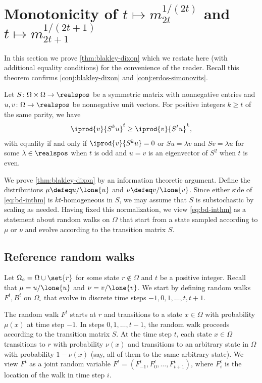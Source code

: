 \section{Monotonicity of 
$t\mapsto m_{2t}^{1/(2t)}$ and 
$t\mapsto m_{2t+1}^{1/(2t+1)}$}
\label{sec:heat:monotonicity}

In this section we prove \autoref{thm:blakley-dixon}
which we restate here 
(with additional equality conditions) 
for the convenience of the reader.
Recall this theorem confirms 
\autoref{conj:blakley-dixon} 
and \autoref{conj:erdos-simonovits}.

\begingroup
\def\thetheorem{\ref{thm:blakley-dixon}}
\begin{theorem}[restated]
Let $S\colon\Omega\times\Omega\to\realspos$ be a 
symmetric matrix with nonnegative entries and 
$u,v\colon\Omega\to\realspos$ be
nonnegative unit vectors. For positive integers 
$k\ge t$ of the same
parity, we have
  \begin{align}
    \iprod{v}{S^ku}^t\ge \iprod{v}{S^tu}^k,
    \label{eq:bd-inthm}
  \end{align}
with equality if and only if $\iprod{v}{S^ku} = 0$ or
$Su =\lambda v$ and $Sv=\lambda u$ for some 
$\lambda\in\realspos$ when $t$ is odd and 
$u=v$ is an eigenvector of $S^2$ when $t$ is even.
\end{theorem}
\addtocounter{theorem}{-1}
\endgroup

We prove \autoref{thm:blakley-dixon} by an 
information theoretic argument.
Define the distributions $\mu \defeq u/\lone{u}$ and 
$\nu \defeq v/\lone{v}$.
Since either side of 
\autoref{eq:bd-inthm} is $kt$-homogeneous in $S$, we may
assume that $S$ is substochastic by scaling as needed. 
Having fixed this normalization, we view 
\autoref{eq:bd-inthm} as a statement about random walks
on $\Omega$ that start from a state sampled according to 
$\mu$ or $\nu$ and evolve according to the transition 
matrix $S$.

\subsection{Reference random walks}
\label{sec:refwalk}
\def\OC{\Omega_\circ}
Let $\OC = \Omega\cup\set{r}$ for some state $r\notin\Omega$ and 
$t$ be a positive integer. Recall that 
$\mu = u/\lone{u}$ and $\nu = v/\lone{v}$.
We start by defining random walks $F^t, B^t$ on $\OC$
that evolve in discrete time steps $-1, 0,1, \ldots, t, t+1$.

The random walk $F^t$ starts at $r$ and transitions to 
a state $x\in\Omega$ with probability $\mu(x)$ at time step $-1$.
In steps $0,1,\ldots, t-1$, the random walk proceeds according to
the transition matrix $S$. At the time step $t$,
each state $x\in\Omega$ transitions to $r$ 
with probability $\nu(x)$ and
transitions to an arbitrary state in 
$\Omega$ with probability
$1-\nu(x)$ 
(say, all of them to the same arbitrary state).
We view $F^t$ as a joint random variable
$F^t = (F^t_{-1},F^t_0,\ldots,F^t_{t+1})$,
where $F^t_i$ is the location of the walk in time step $i$.

